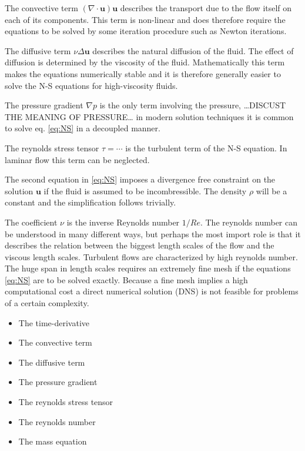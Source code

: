 The convective term $(\nabla \cdot \mathbf{u}) \mathbf{u}$ describes the transport due to the flow itself on each of its components. 
This term is non-linear and does therefore require the equations to be solved by some iteration procedure such as Newton iterations.

The diffusive term $\nu \Delta \mathbf{u}$ describes the natural diffusion of the fluid. The effect of diffusion is determined by the 
viscosity of the fluid. Mathematically this term makes the equations numerically stable and it is therefore generally easier
to solve the N-S equations for high-viscosity fluids. 

The pressure gradient $\nabla p$ is the only term involving the pressure, \ldots DISCUST THE MEANING OF PRESSURE\ldots 
in modern solution techniques it is common to solve eq. \ref{eq:NS} 
in a decoupled manner. 

The reynolds stress tensor $\tau = \cdots$ is the turbulent term of the N-S equation. In laminar flow this term can 
be neglected.

The second equation in \ref{eq:NS} imposes a divergence free constraint on the solution $\mathbf{u}$ if the fluid is 
assumed to be incombressible. The density $\rho$ will be a constant and the simplification follows trivially.

The coefficient $\nu$ is the inverse Reynolds number $1/Re$. The reynolds number can be understood in many different ways, but perhaps the most 
import role is that it describes the relation between the biggest length scales of the flow and the viscous length scales. Turbulent flows are
characterized by high reynolds number. The huge span in length scales requires an extremely fine mesh if the equations \ref{eq:NS} 
are to be solved exactly. Because a fine mesh implies a high computational cost a direct numerical solution (DNS) is not feasible for 
problems of a certain complexity.

\begin{itemize}
\item The time-derivative
\item The convective term 
\item The diffusive term 
\item The pressure gradient
\item The reynolds stress tensor
\item The reynolds number
\item The mass equation
\end{itemize}


